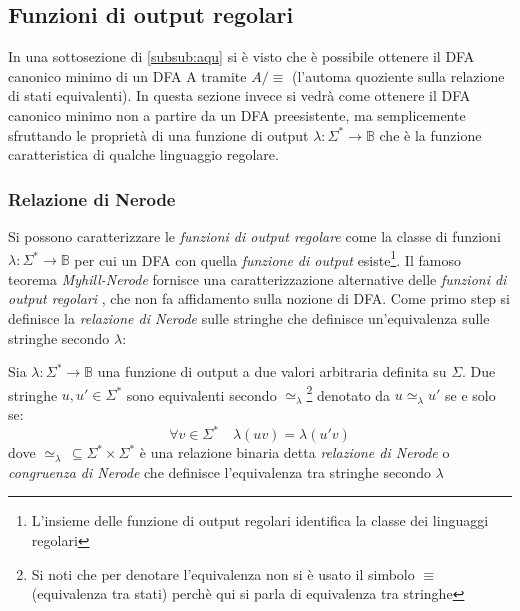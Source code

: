 \subsection{Funzioni di output regolari}
In una sottosezione di \ref{subsub:aqu}  si è visto che è possibile ottenere il  \ac{DFA} canonico minimo di un \ac{DFA} A tramite $A/\!\!\equiv$ (l'automa quoziente sulla relazione di stati equivalenti). In questa sezione invece si vedrà come ottenere il \ac{DFA} canonico minimo non a partire da un \ac{DFA} preesistente, ma semplicemente sfruttando le proprietà di una funzione di output $\lambda : \Sigma^{*} \to \mathbb{B}$ che è la funzione caratteristica di qualche linguaggio regolare.
\subsubsection{Relazione di Nerode}
Si possono caratterizzare le \textit{funzioni di output regolare} come la classe di funzioni $\lambda : \Sigma^{*} \to \mathbb{B}$ per cui un \ac{DFA} con quella \textit{funzione di output} esiste\footnote{L'insieme delle funzione di output regolari identifica la classe dei linguaggi regolari}.  Il famoso teorema \textit{Myhill-Nerode} \cite{Ner58} fornisce una caratterizzazione alternative delle \textit{funzioni di output regolari} , che non fa affidamento sulla nozione di \ac{DFA}. Come primo step si definisce la \textit{relazione di Nerode} \cite{Ner58} sulle stringhe che definisce un'equivalenza sulle stringhe secondo $\lambda$:
\begin{definizione}
\label{def:ner}
Sia $\lambda : \Sigma^{*} \to \mathbb{B}$ una funzione di output a due valori arbitraria definita su $\Sigma$. Due stringhe $u, u' \in \Sigma^{*}$ sono equivalenti secondo $\simeq_\lambda$\footnote{Si noti che per denotare l'equivalenza non si è usato il simbolo $\equiv$ (equivalenza tra stati) perchè qui si parla di equivalenza tra stringhe} denotato da $u \simeq_\lambda \!u'$ se e solo se:
\begin{equation*}
\forall v \in \Sigma^{*} \quad \lambda(uv) = \lambda(u'v)
\end{equation*}
dove $\simeq_\lambda \, \subseteq \Sigma^{*}\!\!\!\times\!\!\Sigma^{*}$ è una relazione binaria detta \textit{relazione di Nerode} o \textit{congruenza di Nerode} che definisce l'equivalenza tra stringhe secondo $\lambda$
\end{definizione}
